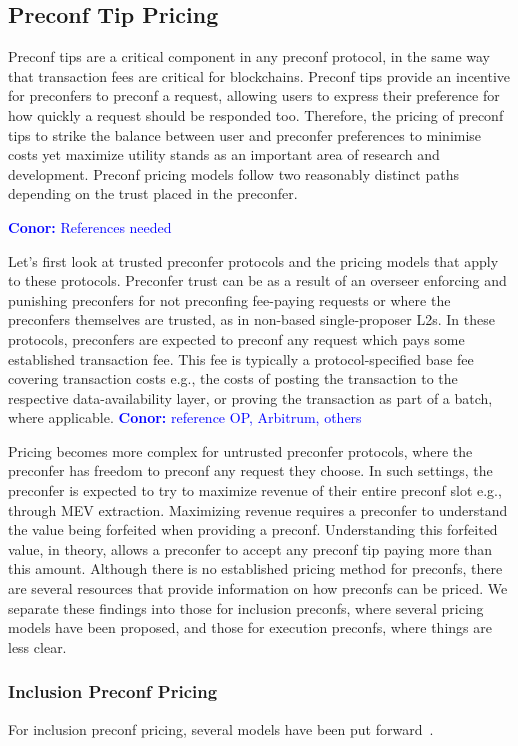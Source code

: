 \documentclass[a4paper]{article}
\theoremstyle{boldstyle}
\newcommand{\cm}[1]{\textcolor{blue}{\textbf{Conor:} #1}}
\begin{document}
    \subsection{Preconf Tip Pricing}
    \label{sec:price}
    
     Preconf tips are a critical component in any preconf protocol, in the same way that transaction fees are critical for blockchains. Preconf tips provide an incentive for preconfers to preconf a request, allowing users to express their preference for how quickly a request should be responded too. Therefore, the pricing of preconf tips to strike the balance between user and preconfer preferences to minimise costs yet maximize utility stands as an important area of research and development. Preconf pricing models follow two reasonably distinct paths depending on the trust placed in the preconfer. 

     \cm{References needed}
     
     Let's first look at trusted preconfer protocols and the pricing models that apply to these protocols. Preconfer trust can be as a result of an overseer enforcing and punishing preconfers for not preconfing fee-paying requests or where the preconfers themselves are trusted, as in non-based single-proposer L2s. In these protocols, preconfers are expected to preconf any request which pays some established transaction fee. This fee is typically a protocol-specified base fee  covering transaction costs e.g., the costs of posting the transaction to the respective data-availability layer, or proving the transaction as part of a batch, where applicable. \cm{reference OP, Arbitrum, others}
     
     Pricing becomes more complex for untrusted preconfer protocols, where the preconfer has freedom to preconf any request they choose. In such settings, the preconfer is expected to try to maximize revenue of their entire preconf slot e.g., through MEV extraction. Maximizing revenue requires a preconfer to understand the value being forfeited when providing a preconf. Understanding this forfeited value, in theory, allows a preconfer to accept any preconf tip paying more than this amount. Although there is no established pricing method for preconfs, there are several resources that provide information on how preconfs can be priced. We separate these findings into those for inclusion preconfs, where several pricing models have been proposed, and those for execution preconfs, where things are less clear.
     
     \subsubsection{Inclusion Preconf Pricing}
     For inclusion preconf pricing, several models have been put forward~\cite{W:APricingModelforInclusionPreconfirmations,W:PricingTransactionsforPreconfirmation}. 
\end{document}
